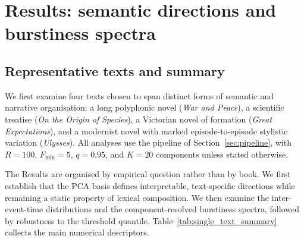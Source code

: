 \documentclass[12pt,a4paper]{article}
\begin{document}

\section{Results: semantic directions and burstiness spectra}
\label{sec:oliver}

\subsection{Representative texts and summary}
\label{sec:representative_summary}

We first examine four texts chosen to span distinct forms of semantic
and narrative organisation: a long polyphonic novel (\emph{War and
Peace}), a scientific treatise (\emph{On the Origin of Species}), a
Victorian novel of formation (\emph{Great Expectations}), and a
modernist novel with marked episode-to-episode stylistic variation
(\emph{Ulysses}). All analyses use the pipeline of
Section~\ref{sec:pipeline}, with $R=100$, $F_{\min}=5$, $q=0.95$, and
$K=20$ components unless stated otherwise.

The Results are organised by empirical question rather than by book.
We first establish that the PCA basis defines interpretable,
text-specific directions while remaining a static property of lexical
composition. We then examine the inter-event-time distributions and the
component-resolved burstiness spectra, followed by robustness to the
threshold quantile. Table~\ref{tab:single_text_summary} collects the
main numerical descriptors.
\end{document}
